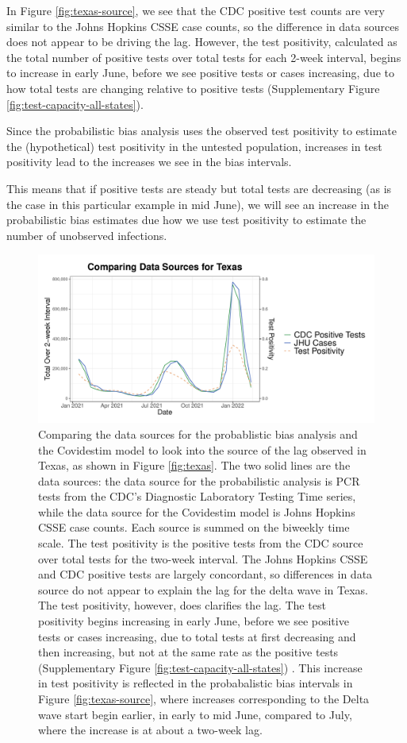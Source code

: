 \documentclass[12pt,twoside]{smiththesis}
\begin{document}
In Figure \ref{fig:texas-source}, we see that the CDC positive test counts are very similar to the Johns Hopkins CSSE case counts, so the difference in data sources does not appear to be driving the lag. However, the test positivity, calculated as the total number of positive tests over total tests for each 2-week interval, begins to increase in early June, before we see positive tests or cases increasing, due to how total tests are changing relative to positive tests (Supplementary Figure \ref{fig:test-capacity-all-states}).

Since the probabilistic bias analysis uses the observed test positivity to estimate the (hypothetical) test positivity in the untested population, increases in test positivity lead to the increases we see in the bias intervals.

This means that if positive tests are steady but total tests are decreasing (as is the case in this particular example in mid June), we will see an increase in the probabilistic bias estimates due how we use test positivity to estimate the number of unobserved infections.
\begin{figure}
\includegraphics[width=1\linewidth]{figure/texas-data-sources} \caption{\label{fig:texas-source} Comparing the data sources for the probablistic bias analysis and the Covidestim model to look into the source of the lag observed in Texas, as shown in Figure \ref{fig:texas}. The two solid lines are the data sources: the data source for the probabilistic analysis is PCR tests from the CDC's Diagnostic Laboratory Testing Time series, while the data source for the Covidestim model is Johns Hopkins CSSE case counts. Each source is summed on the biweekly time scale. The test positivity is the positive tests from the CDC source over total tests for the two-week interval. The Johns Hopkins CSSE and  CDC positive tests are largely concordant, so differences in data source do not appear to explain the lag for the delta wave in Texas. The test positivity, however, does clarifies the lag. The test positivity begins increasing in early June, before we see positive tests or cases increasing, due to total tests at first decreasing and then increasing, but not at the same rate as the positive tests (Supplementary Figure \ref{fig:test-capacity-all-states}) . This increase in test positivity is reflected in the probabalistic bias intervals in Figure \ref{fig:texas-source}, where increases corresponding to the Delta wave start begin earlier, in early to mid June, compared to July, where the increase is at about a two-week lag.}\label{fig:unnamed-chunk-70}
\end{figure}
\end{document}
